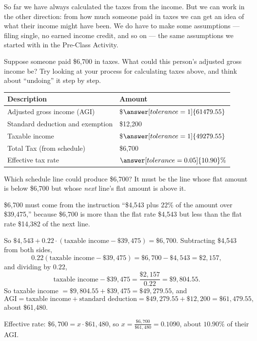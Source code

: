 \documentclass[12pt]{ximera}
\begin{document}
So far we have always calculated the taxes from the income. But we can work in the
other direction: from how much someone paid in taxes we can get an idea of what their
income might have been. We do have to make some assumptions --- filing single, no
earned income credit, and so on --- the same assumptions we started with in the
Pre-Class Activity.

\begin{problem}
Suppose someone paid \$6,700 in taxes. What could this person's adjusted gross income
be? Try looking at your process for calculating taxes above, and think about
``undoing'' it step by step.

\begin{center}
\begin{tabular}{|l|l|}
\hline
Description & Amount \\
\hline
Adjusted gross income (AGI) & \$$\answer[tolerance=1]{61479.55}$ \\
\hline
Standard deduction and exemption & \$12,200 \\
\hline
Taxable income & \$$\answer[tolerance=1]{49279.55}$ \\
\hline
Total Tax (from schedule) & \$6,700 \\
\hline
Effective tax rate & $\answer[tolerance=0.05]{10.90}\%$ \\
\hline
\end{tabular}
\end{center}

\begin{hint}
Which schedule line could produce \$6,700? It must be the line whose flat amount is
below \$6,700 but whose \emph{next} line's flat amount is above it.
\end{hint}

\begin{solution}
\$6,700 must come from the instruction ``\$4,543 plus $22\%$ of the amount over
\$39,475,'' because \$6,700 is more than the flat rate \$4,543 but less than the flat
rate \$14,382 of the next line.

So $\$4{,}543 + 0.22 \cdot (\text{taxable income} - \$39{,}475) = \$6{,}700$.
Subtracting \$4,543 from both sides,
\[
0.22 (\text{taxable income} - \$39{,}475) = \$6{,}700 - \$4{,}543 = \$2{,}157,
\]
and dividing by $0.22$,
\[
\text{taxable income} - \$39{,}475 = \frac{\$2{,}157}{0.22} = \$9{,}804.55.
\]
So taxable income $= \$9{,}804.55 + \$39{,}475 = \$49{,}279.55$, and
\[
\text{AGI} = \text{taxable income} + \text{standard deduction}
= \$49{,}279.55 + \$12{,}200 = \$61{,}479.55,
\]
about \$61,480.

Effective rate: $\$6{,}700 = x \cdot \$61{,}480$, so
$x = \frac{\$6{,}700}{\$61{,}480} = 0.1090$, about $10.90\%$ of their AGI.
\end{solution}
\end{problem}
\end{document}
